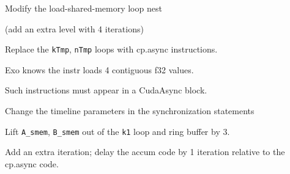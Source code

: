 {\LARGE

Modify the load-shared-memory loop nest

(add an extra level with 4 iterations)

}

\newpage
{}

{\large

}

{\LARGE

Replace the \texttt{kTmp}, \texttt{nTmp} loops with cp.async instructions.

Exo knows the instr loads 4 contiguous f32 values.

}

\newpage
{}

{\large

}

{\LARGE

Such instructions must appear in a CudaAsync block.

}

\newpage
{}

{\large

}

{\LARGE

Change the timeline parameters in the synchronization statements

}

\newpage
{}

{\large

}

{\LARGE

Lift \texttt{A\_smem}, \texttt{B\_smem} out of the \texttt{k1} loop and ring buffer by 3.

}

\newpage
{}

{\large

}

{\LARGE

Add an extra  iteration; delay the accum code by 1 iteration relative to the cp.async code.

}

\newpage
{}

{\large

}

\newpage
{}

{\large

}

